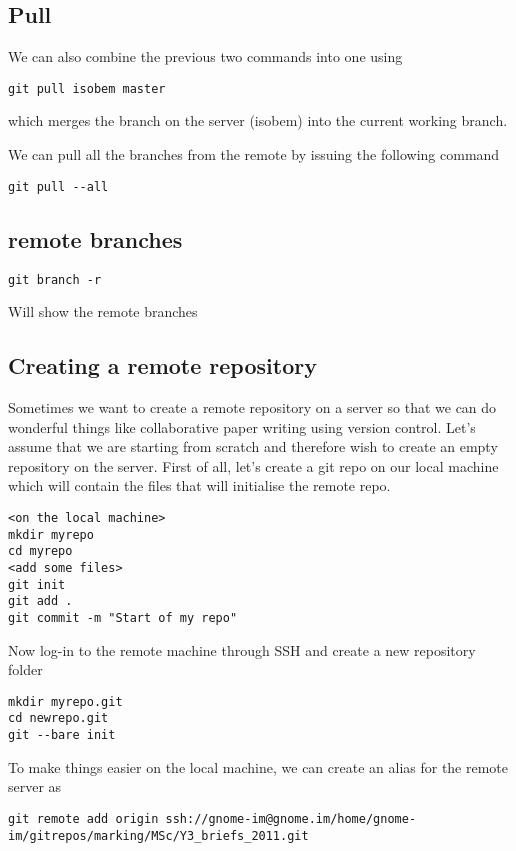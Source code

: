 \documentclass[a4paper, 10pt]{article}
\begin{document}
\subsection*{Pull}
\label{sec:pull}

We can also combine the previous two commands into one using 
\begin{verbatim}
git pull isobem master
\end{verbatim}
which merges the branch on the server (isobem) into the current
working branch. 

We can pull all the branches from the remote by issuing the following
command 
\begin{verbatim}
git pull --all
\end{verbatim}

\subsection*{remote branches}
\begin{Verbatim}
git branch -r
\end{Verbatim}
Will show the remote branches


\subsection{Creating a remote repository}
\label{sec:creat-remote-repos}

Sometimes we want to create a remote repository on a server so that we
can do wonderful things like collaborative paper writing using version
control. Let's assume that we are starting from scratch and therefore
wish to create an empty repository on the server. First of all, let's
create a git repo on our local machine which will contain the files
that will initialise the remote repo.
\begin{verbatim}
<on the local machine>
mkdir myrepo
cd myrepo
<add some files>
git init
git add .
git commit -m "Start of my repo"
\end{verbatim}
Now log-in to the remote machine through SSH and create a new
repository folder
\begin{verbatim}
mkdir myrepo.git
cd newrepo.git
git --bare init
\end{verbatim}

To make things easier on the local machine, we can create an alias for
the remote server as
\begin{verbatim}
git remote add origin ssh://gnome-im@gnome.im/home/gnome-im/gitrepos/marking/MSc/Y3_briefs_2011.git
\end{verbatim}
\end{document}
